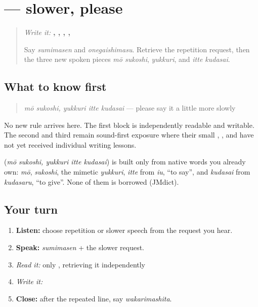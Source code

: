 \section[\texorpdfstring{\ja{もうすこし、ゆっくりいってください} (mō sukoshi …)}{もうすこし、ゆっくりいってください (mō sukoshi …)}]{ — slower, please}

\label{lesson:JA-C10-slower-please}



\begin{quote}
\emph{Write it:} \textbf{, , , , }

Say \emph{sumimasen} and \emph{onegaishimasu}. Retrieve the repetition request, then the three new spoken pieces \emph{mō sukoshi}, \emph{yukkuri}, and \emph{itte kudasai}.
\end{quote}

\subsection*{What to know first}
\begin{quote}
\textbf{}
\end{quote}

\begin{quote}
\emph{mō sukoshi, yukkuri itte kudasai} — please say it a little more slowly
\end{quote}

No new rule arrives here. The first block is independently readable and writable. The second and third remain sound-first exposure where their small \textbf{}, \textbf{}, and \textbf{} have not yet received individual writing lessons.

\begin{cousinweb}
\textbf{} (\emph{mō sukoshi, yukkuri itte kudasai}) is built only from native words you already own: \emph{mō}, \emph{sukoshi}, the mimetic \emph{yukkuri}, \emph{itte} from \emph{iu}, \textquotedblleft{}to say\textquotedblright{}, and \emph{kudasai} from \emph{kudasaru}, \textquotedblleft{}to give\textquotedblright{}. None of them is borrowed (JMdict).
\end{cousinweb}

\subsection*{Your turn}
\begin{enumerate}
\raggedright
  \item \textbf{Listen:} choose repetition or slower speech from the request you hear.
  \item \textbf{Speak:} \emph{sumimasen} + the slower request.
  \item \emph{Read it:} only \textbf{}, retrieving it independently
  \item \emph{Write it:} \textbf{}
  \item \textbf{Close:} after the repeated line, say \emph{wakarimashita}.
\end{enumerate}

